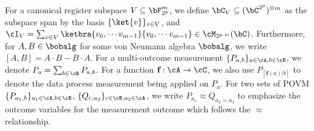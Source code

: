 For a canonical register subspace $V \subseteq \bF_{2^p}^m$, we define $\bC_V \subseteq (\bC^{2^{p}})^{\otimes m}$ as the subspace span by the basis $\{\ket{v}\}_{v \in V}$, and $\cI_{V} = \sum_{v \in V} \ketbra{v_0, \cdots v_{m-1}}{v_0, \cdots v_{m-1}} \in \cM_{2^{p \cdot m}}(\bC)$. Furthermore, for $A,B \in \bobalg$ for some von Neumann algebra $\bobalg$, we write $[A,B] = A\cdot B - B \cdot A$. For a multi-outcome measurement $\{P_{a,b}\}_{a \in \cA, b \in \cB}$, we denote $P_{a} = \sum_{b \in \cB} P_{a,b}$. For a function $\textbf{f}: \cA \rightarrow \cC$, we also use $P_{[\textbf{f}(a)| b]}$ to denote the data process measurement being applied on $P_a$. For two sets of POVM $\{P_{a_1, b}\}_{a_1 \in\cA , b \in \cB}$, $\{Q_{c, a_2}\}_{c \in \cB, a_2 \in \cA}$, we write $P_{a_1} \approx Q_{a_2 = a_1}$ to emphasize the outcome variables for the measurement outcome which follows the $\approx$ relationship. 

